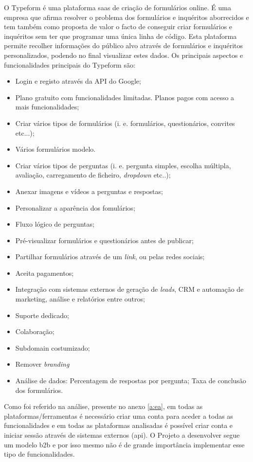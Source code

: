 O Typeform é uma plataforma \acrshort{saas} de criação de formulários online. É uma empresa que afirma resolver o problema dos formulários e inquéritos aborrecidos e tem também como proposta de valor o facto de conseguir criar formulários e inquéritos sem ter que programar uma única linha de código. Esta plataforma permite recolher informações do público alvo através de formulários e inquéritos personalizados, podendo no final visualizar estes dados. 
Os principais aspectos e funcionalidades principais do Typeform são:
\begin{itemize}
	\item Login e registo através da API do Google;
	\item Plano gratuito com funcionalidades limitadas. Planos pagos com acesso a mais funcionalidades;
	\item Criar vários tipos de formulários (i. e. formulários, questionários, convites etc...);
	\item Vários formulários modelo.
	\item Criar vários tipos de perguntas (i. e. pergunta simples, escolha múltipla, avaliação, carregamento de ficheiro, \textit{dropdown} etc..); 
	\item Anexar imagens e vídeos a perguntas e respostas;
	\item Personalizar a aparência dos fomulários; 
	\item Fluxo lógico de perguntas; 
	\item Pré-visualizar formulários e questionários antes de publicar;
	\item Partilhar formulários através de um \textit{link}, ou pelas redes sociais;
	\item Aceita pagamentos;
	\item Integração com sistemas externos de geração de \textit{leads}, CRM e automação de marketing, análise e relatórios entre outros;
	\item Suporte dedicado;
	\item Colaboração;
	\item Subdomain costumizado;
	\item Remover \textit{branding}
	\item Análise de dados:
		\subitem Percentagem de respostas por pergunta;
		\subitem Taxa de conclusão dos formulários.
	
\end{itemize}


Como foi referido na análise, presente no anexo \ref{a:ea}, em todas as plataformas/ferramentas é necessário criar uma conta para aceder a todas as funcionalidades e em todas as plataformas analisadas é possível criar conta e iniciar sessão através de sistemas externos (\acrshort{api}). O Projeto a desenvolver segue um modelo \gls{b2b} e por isso mesmo não é de grande importância implementar esse tipo de funcionalidades.


